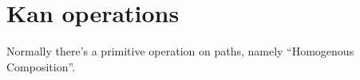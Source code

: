 \section{Kan operations}
\label{sec:kan}

Normally there's a primitive operation on paths,
namely ``Homogenous Composition''.

\TODO